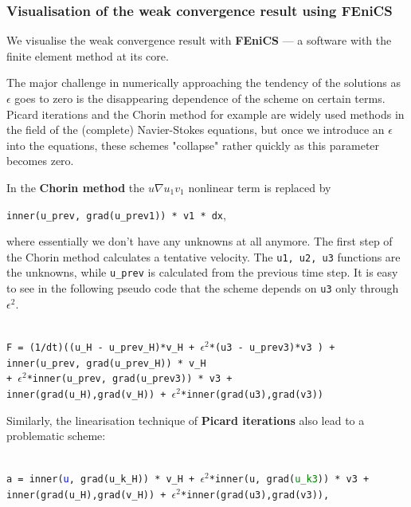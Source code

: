 \documentclass[11pt]{article}
\begin{document}
\subsubsection{Visualisation of the weak convergence result using \textbf{FEniCS}}

We visualise the weak convergence result with \textbf{FEniCS} --- a software with the finite element method at its core.

The major challenge in numerically approaching the tendency of the solutions as $\epsilon$ goes to zero is the disappearing dependence of the scheme on certain terms. Picard iterations and the Chorin method for example are widely used methods in the field of the (complete) Navier-Stokes equations, but once we introduce an $\epsilon$ into the equations, these schemes "collapse" rather quickly as this parameter becomes zero.

In the \textbf{Chorin method} the $u \nabla u_1 v_1$ nonlinear term is replaced by

\texttt{inner(u\_prev, grad(u\_prev1)) * v1 * dx},

where essentially we don't have any unknowns at all anymore. The first step of the Chorin method calculates a tentative velocity. The \texttt{u1, u2, u3} functions are the unknowns, while \texttt{u\_prev} is calculated from the previous time step. It is easy to see in the following pseudo code that the scheme depends on \texttt{\textcolor{terracotta}{u3}} only through $\epsilon^2.$

\texttt{
\\
F = (1/dt)((u\_H - u\_prev\_H)*v\_H + $\epsilon^2$*(\textcolor{terracotta}{u3} - u\_prev3)*v3 ) + \\
inner(u\_prev, grad(u\_prev\_H)) * v\_H\\
 + $\epsilon^2$*inner(u\_prev, grad(u\_prev3)) * v3 + \\
 inner(grad(u\_H),grad(v\_H)) + $\epsilon^2$*inner(grad(\textcolor{terracotta}{u3}),grad(v3)) \\
}

Similarly, the linearisation technique of \textbf{Picard iterations} also lead to a problematic scheme:

\texttt{
\\
a = inner(\textcolor{blue}{u}, grad(u\_k\_H)) * v\_H + $\epsilon^2$*inner(u, grad(\textcolor{green}{u\_k3})) * v3 + \\
inner(grad(u\_H),grad(v\_H)) + $\epsilon^2$*inner(grad(u3),grad(v3)),\\
}
\end{document}
